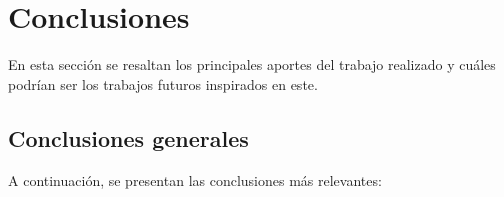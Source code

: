 
\chapter{Conclusiones} %

\label{Chapter5} %

En esta sección se resaltan los principales aportes del trabajo realizado y cuáles podrían ser los trabajos futuros inspirados en este. 



\section{Conclusiones generales }

A continuación, se presentan las conclusiones más relevantes:

